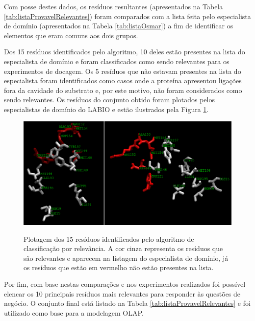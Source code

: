 Com posse destes dados, os resíduos resultantes (apresentados na Tabela \ref{tab:listaProvavelRelevantes}) foram comparados com a lista feita pelo especialista de domínio (apresentados na Tabela \ref{tab:listaOsmar}) a fim de identificar os elementos que eram comuns aos dois grupos. 

Dos 15 resíduos identificados pelo algoritmo, 10 deles estão presentes na lista do especialista de domínio e foram classificados como sendo relevantes para os experimentos de docagem. Os 5 resíduos que não estavam presentes na lista do especialista foram identificados como casos onde a proteína apresentou ligações fora da cavidade do substrato e, por este motivo, não foram considerados como sendo relevantes. Os resíduos do conjunto obtido foram plotados pelos especialistas de domínio do LABIO e estão ilustrados pela Figura \ref{fig:PlotResiduos}. 

\begin{figure}[h]
        \center
        \includegraphics[scale=0.55]{images/avaliacao_Residuos_nomes.png}
        \label{fig:PlotResiduos}
        \caption{Plotagem dos 15 resíduos identificados pelo algoritmo de classificação por relevância. A cor cinza representa os resíduos que são relevantes e aparecem na listagem do especialista de domínio, já os resíduos que estão em vermelho não estão presentes na lista.}
\end{figure}
\newpage
Por fim, com base nestas comparações e nos experimentos realizados foi possível elencar os 10 principais resíduos mais relevantes para responder às questões de negócio. O conjunto final está listado na Tabela \ref{tab:listaProvavelRelevantes} e foi utilizado como base para a modelagem OLAP.

